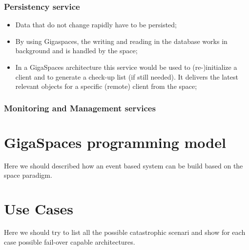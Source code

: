 \documentclass[a4paper,20pt,notitlepage]{article}
\begin{document}
\subsubsection{Persistency service}
\begin{itemize}
 \item Data that do not change rapidly have to be persisted;
 \item By using Gigaspaces, the writing and reading in the database works in background and is handled by the space; 
 \item In a GigaSpaces architecture this service would be used to (re-)initialize a client and to generate a check-up list (if still needed). It delivers the latest relevant objects for a specific (remote) client from the space;
\end{itemize}

\subsubsection{Monitoring and Management services}

\section{GigaSpaces programming model}
Here we should described how an event based system can be build based on the space paradigm.
 
\section{Use Cases}
Here we should try to list all the possible catastrophic scenari and show for each case possible fail-over capable architectures.
\end{document}
